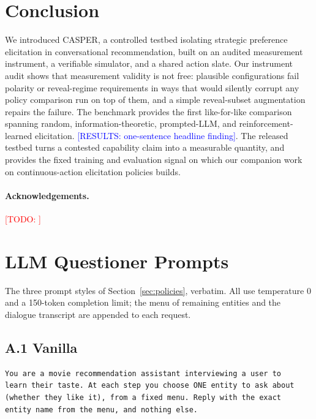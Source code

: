 \documentclass[11pt]{article}
\newcommand{\todo}[1]{\textcolor{red}{[TODO: #1]}}
\newcommand{\results}[1]{\textcolor{blue}{[RESULTS: #1]}}
\begin{document}
\section{Conclusion}
\label{sec:conclusion}

We introduced CASPER, a controlled testbed isolating strategic preference
elicitation in conversational recommendation, built on an audited
measurement instrument, a verifiable simulator, and a shared action slate.
Our instrument audit shows that measurement validity is not free: plausible
configurations fail polarity or reveal-regime requirements in ways that
would silently corrupt any policy comparison run on top of them, and a
simple reveal-subset augmentation repairs the failure. The benchmark
provides the first like-for-like comparison spanning random,
information-theoretic, prompted-LLM, and reinforcement-learned elicitation.
\results{one-sentence headline finding}. The released testbed turns a
contested capability claim into a measurable quantity, and provides the
fixed training and evaluation signal on which our companion work on
continuous-action elicitation policies builds.

\paragraph{Acknowledgements.} \todo{}




\appendix

\section{LLM Questioner Prompts}
\label{app:prompts}

The three prompt styles of Section~\ref{sec:policies}, verbatim. All use
temperature 0 and a 150-token completion limit; the menu of remaining
entities and the dialogue transcript are appended to each request.

\subsection*{A.1 Vanilla}
\begin{verbatim}
You are a movie recommendation assistant interviewing a user to
learn their taste. At each step you choose ONE entity to ask about
(whether they like it), from a fixed menu. Reply with the exact
entity name from the menu, and nothing else.
\end{verbatim}
\end{document}
